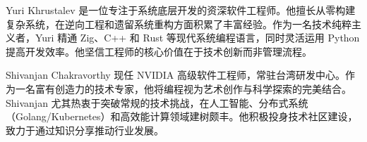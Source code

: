 ﻿Yuri Khrustalev 是一位专注于系统底层开发的资深软件工程师。他擅长从零构建复杂系统，在逆向工程和遗留系统重构方面积累了丰富经验。作为一名技术纯粹主义者，Yuri 精通 Zig、C++ 和 Rust 等现代系统编程语言，同时灵活运用 Python 提高开发效率。他坚信工程师的核心价值在于技术创新而非管理流程。

Shivanjan Chakravorthy 现任 NVIDIA 高级软件工程师，常驻台湾研发中心。作为一名富有创造力的技术专家，他将编程视为艺术创作与科学探索的完美结合。Shivanjan 尤其热衷于突破常规的技术挑战，在人工智能、分布式系统（Golang/Kubernetes）和高效能计算领域建树颇丰。他积极投身技术社区建设，致力于通过知识分享推动行业发展。